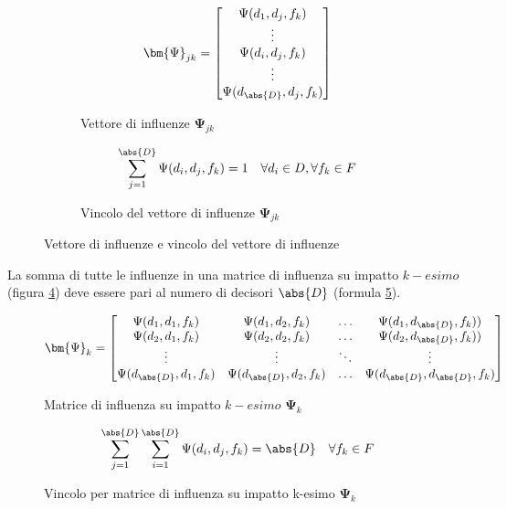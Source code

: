 \documentclass[\main/main.tex]{subfiles}
\begin{document}
\begin{figure}
	\begin{subfigure}{0.45\textwidth}
		\[
			\bm{\Psi}_{jk} = \begin{bmatrix}
				\Psi(d_1,d_j,f_k)         \\
				\vdots                    \\
				\Psi(d_i,d_j,f_k)         \\
				\vdots                    \\
				\Psi(d_{\abs{D}},d_j,f_k) \\
			\end{bmatrix}
		\]
		\caption{Vettore di influenze $\bm{\Psi}_{jk}$}
		\label{influence_vector}
	\end{subfigure}
	\begin{subfigure}{0.45\textwidth}
		\[
			\sum_{j=1}^{\abs{D}} \Psi(d_i, d_j, f_k)= 1 \quad \forall d_i \in D, \forall f_k \in F
		\]
		\caption{Vincolo del vettore di influenze $\bm{\Psi}_{jk}$}
		\label{influence_function_column_limit}
	\end{subfigure}
	\caption{Vettore di influenze e vincolo del vettore di influenze}
\end{figure}

La somma di tutte le influenze in una matrice di influenza su impatto $k-esimo$ (figura \ref{matrice_influenza_k}) deve essere pari al numero di decisori $\abs{D}$ (formula \ref{influence_function_matrix_k_limit}).

\begin{figure}
	\[
		\bm{\Psi}_{k} = \begin{bmatrix}
			\Psi(d_1,d_1,f_k)          & \Psi(d_1,d_2,f_k)          & \ldots & \Psi(d_1,d_{\abs{D}},f_k))          \\
			\Psi(d_2,d_1,f_k)          & \Psi(d_2,d_2,f_k)          & \ldots & \Psi(d_2,d_{\abs{D}},f_k))          \\
			\vdots                     & \vdots                     & \ddots & \vdots                              \\
			\Psi(d_{\abs{D}}, d_1,f_k) & \Psi(d_{\abs{D}}, d_2,f_k) & \ldots & \Psi(d_{\abs{D}}, d_{\abs{D}}, f_k)
		\end{bmatrix}
	\]
	\caption{Matrice di influenza su impatto $k-esimo$ $\bm{\Psi}_k$}
	\label{matrice_influenza_k}
\end{figure}

\begin{figure}
	\[
		\sum_{j=1}^{\abs{D}}\sum_{i=1}^{\abs{D}} \Psi(d_i, d_j, f_k) = \abs{D} \quad \forall f_k \in F
	\]
	\caption{Vincolo per matrice di influenza su impatto k-esimo $\bm{\Psi}_k$}
	\label{influence_function_matrix_k_limit}
\end{figure}
\end{document}
